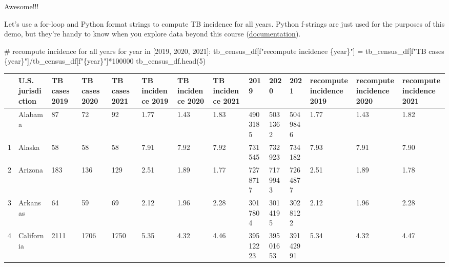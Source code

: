 \documentclass[
  letterpaper,
  DIV=11,
  numbers=noendperiod]{scrreprt}
\newenvironment{Shaded}{\begin{snugshade}}{\end{snugshade}}
\newcommand{\CommentTok}[1]{\textcolor[rgb]{0.37,0.37,0.37}{#1}}
\newcommand{\ControlFlowTok}[1]{\textcolor[rgb]{0.00,0.23,0.31}{#1}}
\newcommand{\DecValTok}[1]{\textcolor[rgb]{0.68,0.00,0.00}{#1}}
\newcommand{\KeywordTok}[1]{\textcolor[rgb]{0.00,0.23,0.31}{#1}}
\newcommand{\NormalTok}[1]{\textcolor[rgb]{0.00,0.23,0.31}{#1}}
\newcommand{\OperatorTok}[1]{\textcolor[rgb]{0.37,0.37,0.37}{#1}}
\newcommand{\SpecialCharTok}[1]{\textcolor[rgb]{0.37,0.37,0.37}{#1}}
\newcommand{\SpecialStringTok}[1]{\textcolor[rgb]{0.13,0.47,0.30}{#1}}
\begin{document}
Awesome!!!

Let's use a for-loop and Python format strings to compute TB incidence
for all years. Python f-strings are just used for the purposes of this
demo, but they're handy to know when you explore data beyond this course
(\href{https://docs.python.org/3/tutorial/inputoutput.html}{documentation}).

\begin{Shaded}
\begin{Highlighting}[]
\CommentTok{\# recompute incidence for all years}
\ControlFlowTok{for}\NormalTok{ year }\KeywordTok{in}\NormalTok{ [}\DecValTok{2019}\NormalTok{, }\DecValTok{2020}\NormalTok{, }\DecValTok{2021}\NormalTok{]:}
\NormalTok{    tb\_census\_df[}\SpecialStringTok{f"recompute incidence }\SpecialCharTok{\{}\NormalTok{year}\SpecialCharTok{\}}\SpecialStringTok{"}\NormalTok{] }\OperatorTok{=}\NormalTok{ tb\_census\_df[}\SpecialStringTok{f"TB cases }\SpecialCharTok{\{}\NormalTok{year}\SpecialCharTok{\}}\SpecialStringTok{"}\NormalTok{]}\OperatorTok{/}\NormalTok{tb\_census\_df[}\SpecialStringTok{f"}\SpecialCharTok{\{}\NormalTok{year}\SpecialCharTok{\}}\SpecialStringTok{"}\NormalTok{]}\OperatorTok{*}\DecValTok{100000}
\NormalTok{tb\_census\_df.head(}\DecValTok{5}\NormalTok{)}
\end{Highlighting}
\end{Shaded}

\begin{longtable}[]{@{}llllllllllllll@{}}
\toprule\noalign{}
& U.S. jurisdiction & TB cases 2019 & TB cases 2020 & TB cases 2021 & TB
incidence 2019 & TB incidence 2020 & TB incidence 2021 & 2019 & 2020 &
2021 & recompute incidence 2019 & recompute incidence 2020 & recompute
incidence 2021 \\
\midrule\noalign{}
\endhead
\bottomrule\noalign{}
\endlastfoot
0 & Alabama & 87 & 72 & 92 & 1.77 & 1.43 & 1.83 & 4903185 & 5031362 &
5049846 & 1.77 & 1.43 & 1.82 \\
1 & Alaska & 58 & 58 & 58 & 7.91 & 7.92 & 7.92 & 731545 & 732923 &
734182 & 7.93 & 7.91 & 7.90 \\
2 & Arizona & 183 & 136 & 129 & 2.51 & 1.89 & 1.77 & 7278717 & 7179943 &
7264877 & 2.51 & 1.89 & 1.78 \\
3 & Arkansas & 64 & 59 & 69 & 2.12 & 1.96 & 2.28 & 3017804 & 3014195 &
3028122 & 2.12 & 1.96 & 2.28 \\
4 & California & 2111 & 1706 & 1750 & 5.35 & 4.32 & 4.46 & 39512223 &
39501653 & 39142991 & 5.34 & 4.32 & 4.47 \\
\end{longtable}
\end{document}
